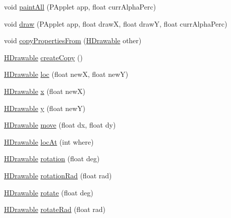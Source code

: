 \begin{DoxyCompactItemize}
\item 
void \hyperlink{classhype_1_1drawable_1_1_h_stage_a52dbf00edea80c21334b3d8bf8e77bdc}{paint\-All} (P\-Applet app, float curr\-Alpha\-Perc)
\item 
void \hyperlink{classhype_1_1drawable_1_1_h_stage_aeda649064cc6592370fe6628ca3c2cb7}{draw} (P\-Applet app, float draw\-X, float draw\-Y, float curr\-Alpha\-Perc)
\item 
void \hyperlink{classhype_1_1drawable_1_1_h_stage_a69b751bec2dcc691dd73c88945bb3f84}{copy\-Properties\-From} (\hyperlink{classhype_1_1drawable_1_1_h_drawable}{H\-Drawable} other)
\item 
\hyperlink{classhype_1_1drawable_1_1_h_drawable}{H\-Drawable} \hyperlink{classhype_1_1drawable_1_1_h_stage_aa7e644b2063eda66b2860a8d60ba124f}{create\-Copy} ()
\item 
\hyperlink{classhype_1_1drawable_1_1_h_drawable}{H\-Drawable} \hyperlink{classhype_1_1drawable_1_1_h_stage_a1c85e616f556722f523819b59b6b7661}{loc} (float new\-X, float new\-Y)
\item 
\hyperlink{classhype_1_1drawable_1_1_h_drawable}{H\-Drawable} \hyperlink{classhype_1_1drawable_1_1_h_stage_a28aabd3bca1fdabfa092ebe3c7c3a82d}{x} (float new\-X)
\item 
\hyperlink{classhype_1_1drawable_1_1_h_drawable}{H\-Drawable} \hyperlink{classhype_1_1drawable_1_1_h_stage_a0cb3ba260c10dc0795441102e575dc7c}{y} (float new\-Y)
\item 
\hyperlink{classhype_1_1drawable_1_1_h_drawable}{H\-Drawable} \hyperlink{classhype_1_1drawable_1_1_h_stage_ab6865d98aa10cebe8ce6915e9984da7d}{move} (float dx, float dy)
\item 
\hyperlink{classhype_1_1drawable_1_1_h_drawable}{H\-Drawable} \hyperlink{classhype_1_1drawable_1_1_h_stage_aa9a71e52b085ef8ee467d7cd801ce2ed}{loc\-At} (int where)
\item 
\hyperlink{classhype_1_1drawable_1_1_h_drawable}{H\-Drawable} \hyperlink{classhype_1_1drawable_1_1_h_stage_a1aa9971c8627c27318861b3c24f0663f}{rotation} (float deg)
\item 
\hyperlink{classhype_1_1drawable_1_1_h_drawable}{H\-Drawable} \hyperlink{classhype_1_1drawable_1_1_h_stage_a9788c0814a611ac36e691c69dc0b2f13}{rotation\-Rad} (float rad)
\item 
\hyperlink{classhype_1_1drawable_1_1_h_drawable}{H\-Drawable} \hyperlink{classhype_1_1drawable_1_1_h_stage_a9f9b1b42692ba75442c3c77a02ae54bf}{rotate} (float deg)
\item 
\hyperlink{classhype_1_1drawable_1_1_h_drawable}{H\-Drawable} \hyperlink{classhype_1_1drawable_1_1_h_stage_a376cc1a9c6d4700d9e8f2cf73dd34bb6}{rotate\-Rad} (float rad)
\end{DoxyCompactItemize}
